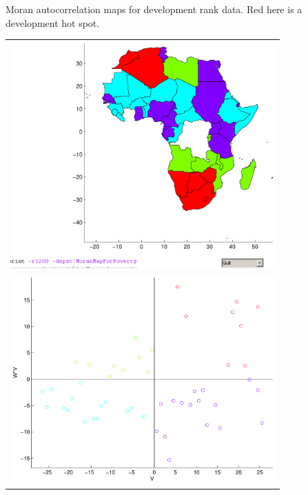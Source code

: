 Moran autocorrelation maps for development rank data.  Red here is
a development hot spot.

\begin{tabular}{ c}
   \includegraphics[width=4in]{Images/GIS/MoranMapForDevelopmentAggregateRanks.pdf}\\
  \includegraphics[width=4in]{Images/GIS/MoranScatterPlotForDevelopmentAggregateRanks.pdf}
\end{tabular}
